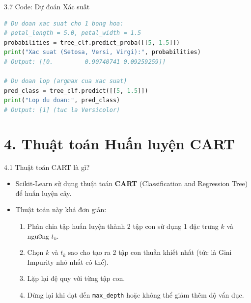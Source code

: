 \documentclass[aspectratio=169, 12pt]{beamer}
\begin{document}
\begin{frame}[fragile]{3.7 Code: Dự đoán Xác suất}
\begin{lstlisting}[language=Python]
# Du doan xac suat cho 1 bong hoa:
# petal_length = 5.0, petal_width = 1.5
probabilities = tree_clf.predict_proba([[5, 1.5]])
print("Xac suat (Setosa, Versi, Virgi):", probabilities)
# Output: [[0.         0.90740741 0.09259259]]

# Du doan lop (argmax cua xac suat)
pred_class = tree_clf.predict([[5, 1.5]])
print("Lop du doan:", pred_class)
# Output: [1] (tuc la Versicolor)
\end{lstlisting}
\end{frame}


\section{4. Thuật toán Huấn luyện CART}

\begin{frame}{4.1 Thuật toán CART là gì?}
    \begin{itemize}
        \item Scikit-Learn sử dụng thuật toán \textbf{CART} (Classification and Regression Tree) để huấn luyện cây.
        \item Thuật toán này khá đơn giản:
        \begin{enumerate}
            \item Phân chia tập huấn luyện thành 2 tập con sử dụng 1 đặc trưng $k$ và ngưỡng $t_k$.
            \item Chọn $k$ và $t_k$ sao cho tạo ra 2 tập con thuần khiết nhất (tức là Gini Impurity nhỏ nhất có thể).
            \item Lặp lại đệ quy với từng tập con.
            \item Dừng lại khi đạt đến \texttt{max\_depth} hoặc không thể giảm thêm độ vẩn đục.
        \end{enumerate}
    \end{itemize}
\end{frame}
\end{document}
